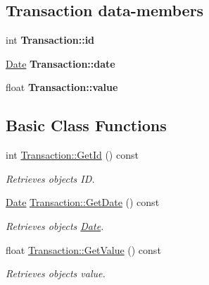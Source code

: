 \subsection*{Transaction data-\/members}
\begin{DoxyCompactItemize}
\item 
\mbox{\label{group___transaction_ga8e43580c2afbd59f46bafbd7dccb2ad0}} 
int {\bfseries Transaction\+::id}
\item 
\mbox{\label{group___transaction_ga58870d949a7719c687e350624e4f1b12}} 
\hyperlink{class_date}{Date} {\bfseries Transaction\+::date}
\item 
\mbox{\label{group___transaction_ga52a88fab74bd40bb7e8c9fec9cad2f4a}} 
float {\bfseries Transaction\+::value}
\end{DoxyCompactItemize}
\subsection*{Basic Class Functions}
\begin{DoxyCompactItemize}
\item 
int \hyperlink{group___transaction_ga73ff525f9baae732b1256533736e5052}{Transaction\+::\+Get\+Id} () const
\begin{DoxyCompactList}\small\item\em Retrieves object\textquotesingle{}s ID. \end{DoxyCompactList}\item 
\hyperlink{class_date}{Date} \hyperlink{group___transaction_ga05b17fe71d38937648b77f964df4de5d}{Transaction\+::\+Get\+Date} () const
\begin{DoxyCompactList}\small\item\em Retrieves object\textquotesingle{}s \hyperlink{class_date}{Date}. \end{DoxyCompactList}\item 
float \hyperlink{group___transaction_ga3dca9a51e64e6fcb07f501eb2724676d}{Transaction\+::\+Get\+Value} () const
\begin{DoxyCompactList}\small\item\em Retrieves object\textquotesingle{}s value. \end{DoxyCompactList}\end{DoxyCompactItemize}
